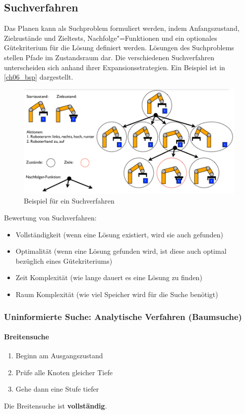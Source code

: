 \subsection{Suchverfahren}
Das Planen kann als Suchproblem formuliert werden, indem Anfangszustand, Zielzustände und Zieltests, Nachfolge"=Funktionen und ein optionales Gütekriterium für die Lösung definiert werden.
Lösungen des Suchproblems stellen Pfade im Zustandsraum dar.
Die verschiedenen Suchverfahren unterscheiden sich anhand ihrer Expansionsstrategien. Ein Beispiel ist in \autoref{ch06_bsp} dargestellt.
\begin{figure}[!h]
	\centering 
	\includegraphics[width=.8\textwidth]{figures/ch06_bsp.png}
	\caption{Beispiel für ein Suchverfahren}
	\label{ch06_bsp}
\end{figure}
Bewertung von Suchverfahren:
\begin{itemize}
	\item Vollständigkeit (wenn eine Lösung existiert, wird sie auch gefunden)
	\item Optimalität (wenn eine Lösung gefunden wird, ist diese auch optimal bezüglich eines Gütekriteriums)
	\item Zeit Komplexität (wie lange dauert es eine Lösung zu finden)
	\item Raum Komplexität (wie viel Speicher wird für die Suche benötigt)
\end{itemize}

\subsubsection{Uninformierte Suche: Analytische Verfahren (Baumsuche)}
\paragraph*{Breitensuche}
\begin{enumerate}
	\item Beginn am Ausgangszustand
	\item Prüfe alle Knoten gleicher Tiefe
	\item Gehe dann eine Stufe tiefer
\end{enumerate}
Die Breitensuche ist \textbf{vollständig}.

